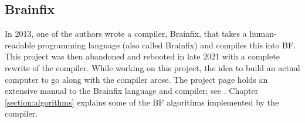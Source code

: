 \subsection{Brainfix}
In 2013, one of the authors wrote a compiler, Brainfix, that takes a human-readable programming language (also called Brainfix) and compiles this into BF. This project was then abandoned and rebooted in late 2021 with a complete rewrite of the compiler. While working on this project, the idea to build an actual computer to go along with the compiler arose. The project page holds an extensive manual to the Brainfix language and compiler; see \cite{brainfix}. Chapter \ref{section:algorithms} explains some of the BF algorithms implemented by the compiler.
